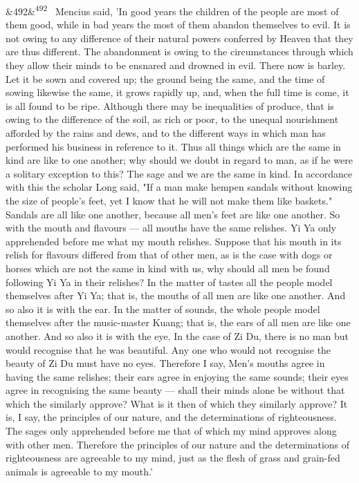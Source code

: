 \documentclass[12pt]{article}
\newcommand{\para}[1][]{\par\noindent\ifx&#1&\else\textsuperscript{\footnotesize #1}~\fi}
\begin{document}
\para[492] Mencius said, 'In good years the children of the people are most of them good, while in bad years the most of them abandon themselves to evil. It is not owing to any difference of their natural powers conferred by Heaven that they are thus different. The abandonment is owing to the circumstances through which they allow their minds to be ensnared and drowned in evil. There now is barley. Let it be sown and covered up; the ground being the same, and the time of sowing likewise the same, it grows rapidly up, and, when the full time is come, it is all found to be ripe. Although there may be inequalities of produce, that is owing to the difference of the soil, as rich or poor, to the unequal nourishment afforded by the rains and dews, and to the different ways in which man has performed his business in reference to it. Thus all things which are the same in kind are like to one another; why should we doubt in regard to man, as if he were a solitary exception to this? The sage and we are the same in kind. In accordance with this the scholar Long said, "If a man make hempen sandals without knowing the size of people's feet, yet I know that he will not make them like baskets." Sandals are all like one another, because all men's feet are like one another. So with the mouth and flavours --- all mouths have the same relishes. Yi Ya only apprehended before me what my mouth relishes. Suppose that his mouth in its relish for flavours differed from that of other men, as is the case with dogs or horses which are not the same in kind with us, why should all men be found following Yi Ya in their relishes? In the matter of tastes all the people model themselves after Yi Ya; that is, the mouths of all men are like one another. And so also it is with the ear. In the matter of sounds, the whole people model themselves after the music-master Kuang; that is, the ears of all men are like one another. And so also it is with the eye. In the case of Zi Du, there is no man but would recognise that he was beautiful. Any one who would not recognise the beauty of Zi Du must have no eyes. Therefore I say, Men's mouths agree in having the same relishes; their ears agree in enjoying the same sounds; their eyes agree in recognising the same beauty --- shall their minds alone be without that which the similarly approve? What is it then of which they similarly approve? It is, I say, the principles of our nature, and the determinations of righteousness. The sages only apprehended before me that of which my mind approves along with other men. Therefore the principles of our nature and the determinations of righteousness are agreeable to my mind, just as the flesh of grass and grain-fed animals is agreeable to my mouth.'
\end{document}
